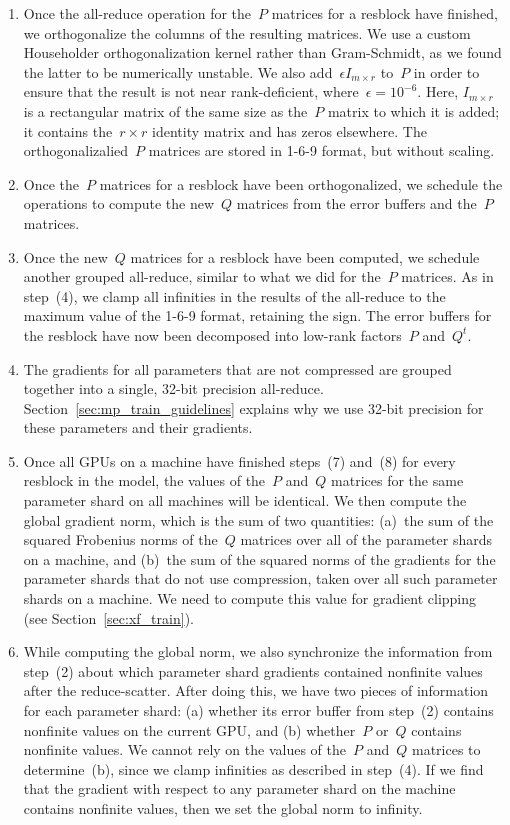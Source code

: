 \documentclass{article}
\begin{document}
\begin{enumerate}
    \item Once the all-reduce operation for the~$P$ matrices for a resblock have finished, we orthogonalize the columns of the resulting matrices. We use a custom Householder orthogonalization kernel rather than Gram-Schmidt, as we found the latter to be numerically unstable. We also add~$\epsilon I_{m \times r}$ to~$P$ in order to ensure that the result is not near rank-deficient, where~$\epsilon = 10^{-6}$. Here, $I_{m \times r}$ is a rectangular matrix of the same size as the~$P$ matrix to which it is added; it contains the~$r \times r$ identity matrix and has zeros elsewhere. The orthogonalizalied~$P$ matrices are stored in 1-6-9 format, but without scaling. 
    \item Once the~$P$ matrices for a resblock have been orthogonalized, we schedule the operations to compute the new~$Q$ matrices from the error buffers and the~$P$ matrices.
    \item Once the new~$Q$ matrices for a resblock have been computed, we schedule another grouped all-reduce, similar to what we did for the~$P$ matrices. As in step~(4), we clamp all infinities in the results of the all-reduce to the maximum value of the 1-6-9 format, retaining the sign. The error buffers for the resblock have now been decomposed into low-rank factors~$P$ and~$Q^t$.
    \item The gradients for all parameters that are not compressed are grouped together into a single, 32-bit precision all-reduce. Section~\ref{sec:mp_train_guidelines} explains why we use 32-bit precision for these parameters and their gradients.
    \item Once all GPUs on a machine have finished steps~(7) and~(8) for every resblock in the model, the values of the~$P$ and~$Q$ matrices for the same parameter shard on all machines will be identical. We then compute the global gradient norm, which is the sum of two quantities: (a)~the sum of the squared Frobenius norms of the~$Q$ matrices over all of the parameter shards on a machine, and (b)~the sum of the squared norms of the gradients for the parameter shards that do not use compression, taken over all such parameter shards on a machine. We need to compute this value for gradient clipping (see Section~\ref{sec:xf_train}).
    \item While computing the global norm, we also synchronize the information from step~(2) about which parameter shard gradients contained nonfinite values after the reduce-scatter. After doing this, we have two pieces of information for each parameter shard: (a) whether its error buffer from step~(2) contains nonfinite values on the current GPU, and (b) whether~$P$ or~$Q$ contains nonfinite values. We cannot rely on the values of the~$P$ and~$Q$ matrices to determine~(b), since we clamp infinities as described in step~(4). If we find that the gradient with respect to any parameter shard on the machine contains nonfinite values, then we set the global norm to infinity.

\end{enumerate}
\end{document}

